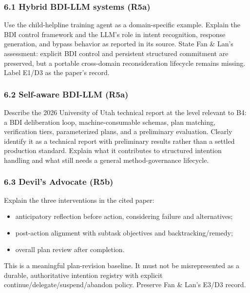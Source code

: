 \subsubsection{6.1 Hybrid BDI-LLM systems (R5a)}\label{hybrid-bdi-llm-systems-r5a}

Use the child-helpline training agent as a domain-specific example. Explain the BDI control framework and the LLM's role in intent recognition, response generation, and bypass behavior as reported in its source. State Fan \& Lan's assessment: explicit BDI control and persistent structured commitment are preserved, but a portable cross-domain reconsideration lifecycle remains missing. Label E1/D3 as the paper's record.\autocite{owayyed2025controlled,lawton2026selfawarebdi}

\subsubsection{6.2 Self-aware BDI-LLM (R5a)}\label{self-aware-bdi-llm-r5a}

Describe the 2026 University of Utah technical report at the level relevant to B4: a BDI deliberation loop, machine-consumable schemas, plan matching, verification tiers, parameterized plans, and a preliminary evaluation. Clearly identify it as a technical report with preliminary results rather than a settled production standard. Explain what it contributes to structured intention handling and what still needs a general method-governance lifecycle.

\subsubsection{6.3 Devil's Advocate (R5b)}\label{devils-advocate-r5b}

Explain the three interventions in the cited paper:

\begin{itemize}
\tightlist
\item
  anticipatory reflection before action, considering failure and alternatives;
\item
  post-action alignment with subtask objectives and backtracking/remedy;
\item
  overall plan review after completion.
\end{itemize}

This is a meaningful plan-revision baseline. It must not be misrepresented as a durable, authoritative intention registry with explicit continue/delegate/suspend/abandon policy. Preserve Fan \& Lan's E3/D3 record.\autocite{wang2024devilsadvocate}

